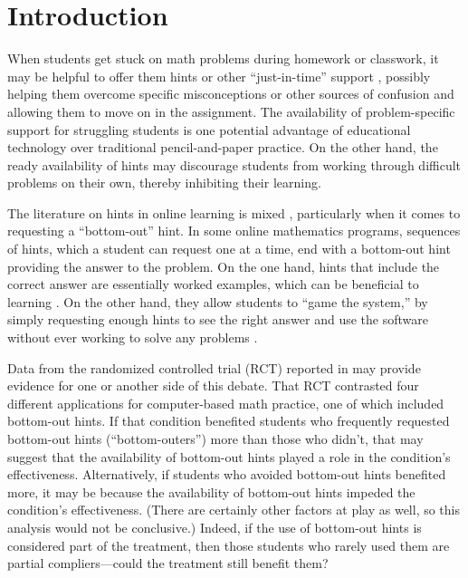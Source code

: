 \documentclass[]{article}
\begin{document}
\clearpage

\section{Introduction}

When students get stuck on math problems during homework or classwork, it may be helpful to offer them hints or other ``just-in-time'' support \cite[e.g][]{jit}, possibly helping them overcome specific misconceptions or other sources of confusion and allowing them to move on in the assignment.
The availability of problem-specific support for struggling students is one potential advantage of educational technology over traditional pencil-and-paper practice.
On the other hand, the ready availability of hints may discourage students from working through difficult problems on their own, thereby inhibiting their learning.

The literature on hints in online learning is mixed \citep[see, e.g.,][]{aleven2016help,goldin2012learner,sales2021student}, particularly when it comes to requesting a ``bottom-out'' hint. In some online mathematics programs, sequences of hints, which a student can request one at a time, end with a bottom-out hint providing the answer to the problem. On the one hand, hints that include the correct answer are essentially worked examples, which can be beneficial to learning \citep[e.g.]{sweller1985use}. On the other hand, they allow students to ``game the system,'' by simply requesting enough hints to see the right answer and use the software without ever working to solve any problems \citep[e.g.][]{guo2008trying}.

Data from the randomized controlled trial (RCT) reported in \citet{impactPaper} may provide evidence for one or another side of this debate.
That RCT contrasted four different applications for computer-based math practice, one of which included bottom-out hints.
If that condition benefited students who frequently requested bottom-out hints (``bottom-outers'') more than those who didn't, that may suggest that the availability of bottom-out hints played a role in the condition's effectiveness.
Alternatively, if students who avoided bottom-out hints benefited more, it may be because the availability of bottom-out hints impeded the condition's effectiveness.
(There are certainly other factors at play as well, so this analysis would not be conclusive.)
Indeed, if the use of bottom-out hints is considered part of the treatment, then those students who rarely used them are partial compliers---could the treatment still benefit them?
\end{document}
